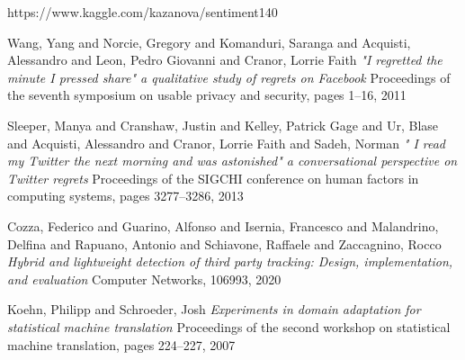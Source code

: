 \begin{thebibliography}{9}
https://www.kaggle.com/kazanova/sentiment140

Wang, Yang and Norcie, Gregory and Komanduri, Saranga and Acquisti, Alessandro and Leon, Pedro Giovanni and Cranor, Lorrie Faith\newline
\textit{"I regretted the minute I pressed share" a qualitative study of regrets on Facebook}\newline
Proceedings of the seventh symposium on usable privacy and security, pages 1--16, 2011 

Sleeper, Manya and Cranshaw, Justin and Kelley, Patrick Gage and Ur, Blase and Acquisti, Alessandro and Cranor, Lorrie Faith and Sadeh, Norman\newline
\textit{" I read my Twitter the next morning and was astonished" a conversational perspective on Twitter regrets}\newline
Proceedings of the SIGCHI conference on human factors in computing systems, pages 3277--3286, 2013

Cozza, Federico and Guarino, Alfonso and Isernia, Francesco and Malandrino, Delfina and Rapuano, Antonio and Schiavone, Raffaele and Zaccagnino, Rocco\newline
\textit{Hybrid and lightweight detection of third party tracking: Design, implementation, and evaluation}\newline
Computer Networks, 106993, 2020

Koehn, Philipp and Schroeder, Josh\newline
\textit{Experiments in domain adaptation for statistical machine translation}\newline
Proceedings of the second workshop on statistical machine translation, pages 224--227, 2007

\end{thebibliography}
